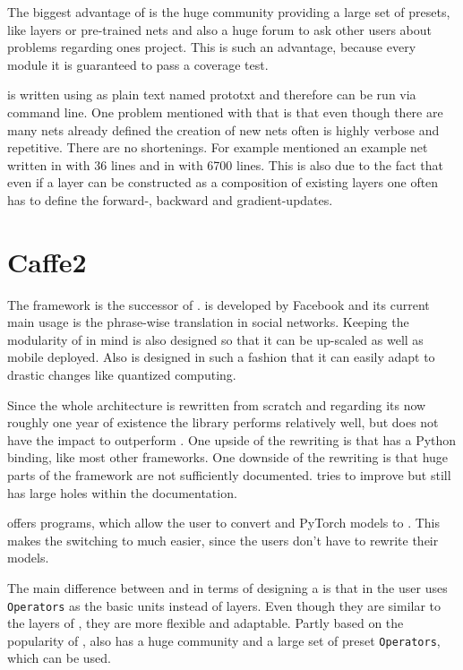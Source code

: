 The biggest advantage of \caffe is the huge community providing a large set of presets, like layers or pre-trained nets and also a huge forum to ask other users about problems regarding ones project. This is such an advantage, because every module it is  guaranteed to pass a coverage test. \cite{jia2014caffe}

\caffe is written using as plain text named prototxt and therefore can be run via command line. One problem mentioned with that is that even though there are many nets already defined the creation of new nets often is highly verbose and repetitive. There are no shortenings. For example \cite{tim2018CNNArchLang} mentioned an example net written in \cnnarch with 36 lines and in \caffe with 6700 lines. This is also due to the fact that even if a layer can be constructed as a composition of existing layers one often has to define the forward-, backward and gradient-updates. %

\section{Caffe2} \label{sec: Caffe2}
The framework \caffetwo is the successor of \caffe. \caffetwo is developed by Facebook and its current main usage is the phrase-wise translation in social networks. Keeping the modularity of \caffe in mind \caffetwo is also designed so that it can be up-scaled as well as mobile deployed. Also \caffetwo is designed in such a fashion that it can easily adapt to drastic changes like quantized computing. \cite{Caffe2Homepage}

Since the whole architecture is rewritten from scratch and regarding its now roughly one year of existence the library performs relatively well, but does not have the impact to outperform \caffe \cite{heise:Caffe2}.
One upside of the rewriting is that \caffetwo has a Python binding, like most other frameworks. One downside of the rewriting is that huge parts of the framework are not sufficiently documented. \caffetwo tries to improve but still has large holes within the documentation. \cite{tim2018CNNArchLang}

\caffetwo offers programs, which allow the user to convert \caffe and PyTorch models to \caffetwo. This makes the switching to \caffetwo much easier, since the users don't have to rewrite their models. \cite{Caffe2Homepage}

The main difference between \caffe and \caffetwo in terms of designing a \nn is that in \caffetwo the user uses \texttt{Operators} as the basic units instead of layers. Even though they are similar to the layers of \caffe, they are more flexible and adaptable. Partly based on the popularity of \caffe, \caffetwo also has a huge community and a large set of preset \texttt{Operators}, which can be used. \cite{Caffe2Homepage}

